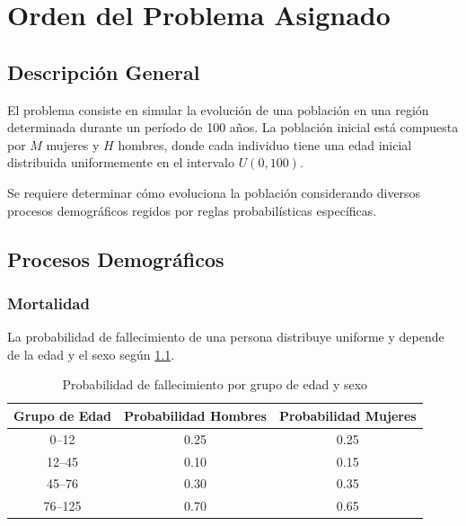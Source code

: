 \documentclass[12pt, a4paper, spanish]{report}
\begin{document}
\tableofcontents
\newpage

\chapter{Orden del Problema Asignado}

\section{Descripción General}

El problema consiste en simular la evolución de una población en una región determinada durante un período de 100 años. La población inicial está compuesta por $M$ mujeres y $H$ hombres, donde cada individuo tiene una edad inicial distribuida uniformemente en el intervalo $U(0, 100)$.

Se requiere determinar cómo evoluciona la población considerando diversos procesos demográficos regidos por reglas probabilísticas específicas.

\section{Procesos Demográficos}

\subsection{Mortalidad}

La probabilidad de fallecimiento de una persona distribuye uniforme y depende de la edad y el sexo según \ref{table:mortality}.

\begin{table}[h]
    \centering
    \caption{Probabilidad de fallecimiento por grupo de edad y sexo}\label{table:mortality}
    \begin{tabular}{|c|c|c|}
    \hline
    \textbf{Grupo de Edad} & \textbf{Probabilidad Hombres} & \textbf{Probabilidad Mujeres} \\
    \hline
    0--12 & 0.25 & 0.25 \\
    12--45 & 0.10 & 0.15 \\
    45--76 & 0.30 & 0.35 \\
    76--125 & 0.70 & 0.65 \\
    \hline
    \end{tabular}
\end{table}
\end{document}
